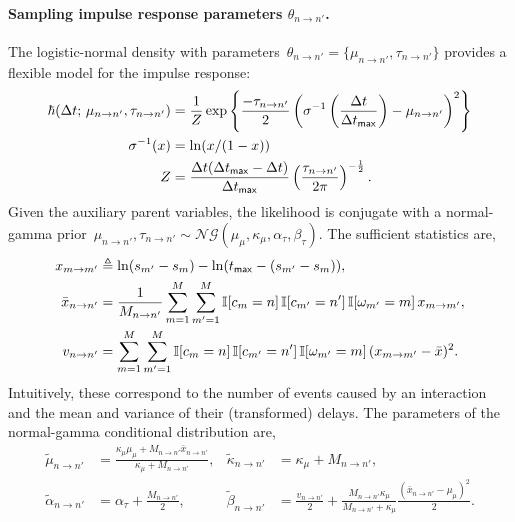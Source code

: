 \paragraph{Sampling impulse response parameters $\theta_{n \to n'}$.}
The logistic-normal density with parameters~${\theta_{n \to
    n'}=\{\mu_{n \to n'},\tau_{n \to n'}\}}$ provides a flexible model
for the impulse response:
\begin{align*}
  \hbar(\Delta t ; \,  \mu_{n \to n'}, \tau_{n \to n'})
  &=\frac{1}{Z}\exp\left\{\frac{-\tau_{n \to n'}}{2}
  \left(\sigma^{-1}\left(\frac{\Delta t}{\Delta t_{\mathsf{max}}}\right)
  - \mu_{n \to n'} \right)^2 \right\} \\
  \sigma^{-1}(x) &= \ln(x/(1-x))\\ Z &=
  \frac{\Delta t(\Delta t_{\sf{max}}-\Delta t)}{\Delta t_{\mathsf{max}}}
  \left(\frac{\tau_{n \to n'}}{2\pi}\right)^{-\frac{1}{2}}.
\end{align*}
Given the auxiliary parent variables, the likelihood is conjugate with
a normal-gamma prior~${\mu_{n \to n'},\tau_{n \to n'} \sim
  \mathcal{NG}(\mu_\mu,\kappa_\mu,\alpha_\tau,\beta_\tau)}$.
The sufficient statistics are,
\begin{align*}
x_{m \to m'} &\triangleq \ln(s_{m'}-s_m)-\ln(t_{\sf{max}}-(s_{m'}-s_m)), \\
\bar{x}_{n \to n'} &= \frac{1}{M_{n \to n'}} \sum_{m=1}^M \sum_{m'=1}^M \mathbb{I}[c_m=n] \, \mathbb{I}[c_{m'}=n'] \, \mathbb{I}[\omega_{m'}=m] \,x_{m \to m'}, \\
v_{n \to n'} &= \sum_{m=1}^M \sum_{m'=1}^M \mathbb{I}[c_m=n] \, \mathbb{I}[c_{m'}=n'] \, \mathbb{I}[\omega_{m'}=m] \, (x_{m \to m'} - \bar{x})^2.
\end{align*}
Intuitively, these correspond to the number of events caused by an
interaction and the mean and variance of their (transformed) delays.
The parameters of the normal-gamma conditional distribution are,
\begin{align*}
  \widetilde{\mu}_{n \to n'} &= \frac{\kappa_\mu \mu_\mu + M_{n \to n'} \bar{x}_{n \to n'}}{\kappa_\mu + M_{n \to n'}}, 
  &
  \widetilde{\kappa}_{n \to n'} &= \kappa_\mu + M_{n \to n'}, \\
  \widetilde{\alpha}_{n \to n'} &= \alpha_{\tau} + \frac{M_{n \to n'}}{2},
  & 
  \widetilde{\beta}_{n \to n'} &= \frac{v_{n \to n'}}{2} + \frac{M_{n \to n'} \kappa_\mu}{M_{n \to n'} + \kappa_\mu}\frac{(\bar{x}_{n \to n'} - \mu_\mu)^2}{2}.
\end{align*}

